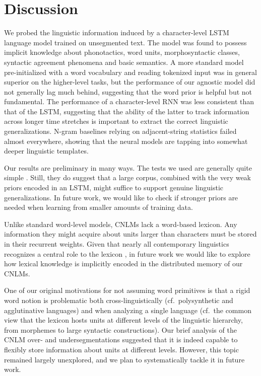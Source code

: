 \section{Discussion}
\label{sec:discussion}

We probed the linguistic information induced by a character-level LSTM
language model trained on unsegmented text. The model was found to
possess implicit knowledge about phonotactics, word units,
morphosyntactic classes, syntactic agreement phenomena and basic
semantics. A more standard model pre-initialized with a word
vocabulary and reading tokenized input was in general superior on the
higher-level tasks, but the performance of our agnostic model did not
generally lag much behind, suggesting that the word prior is helpful
but not fundamental. The performance of a character-level RNN was less
consistent than that of the LSTM, suggesting that the ability of the
latter to track information across longer time stretches is important
to extract the correct linguistic generalizations. N-gram baselines
relying on adjacent-string statistics failed almost everywhere,
showing that the neural models are tapping into somewhat deeper
linguistic templates.

Our results are preliminary in many ways. The tests we used are
generally quite simple \cite[we did not attempt, for example, to model
long-distance subject-verb agreement, a task that is challenging even
for word-based models:][]{Linzen:etal:2016}. Still, they do suggest
that a large corpus, combined with the very weak priors encoded in an
LSTM, might suffice to support genuine linguistic generalizations. In
future work, we would like to check if stronger priors are needed when
learning from smaller amounts of training data.

Unlike standard word-level models, CNLMs lack a word-based
lexicon. Any information they might acquire about units larger than
characters must be stored in their recurrent weights. Given that
nearly all contemporary linguistics recognizes a central role to the
lexicon \cite[see,
e.g.,][]{Sag:etal:2003,Goldberg:2005,Radford:2006,Bresnan:etal:2016,Jezek:2016},
in future work we would like to explore how lexical knowledge is
implicitly encoded in the distributed memory of our CNLMs.

One of our original motivations for not assuming word primitives is that a rigid word notion is problematic both cross-linguistically (cf.~polysynthetic and agglutinative languages) and when analyzing a single language (cf.~the common  view  that the lexicon hosts units at different levels of the linguistic hierarchy, from  morphemes to large syntactic constructions). Our brief analysis of the CNLM over- and undersegmentations suggested that it is indeed capable to flexibly store information about units at different levels. However, this topic  remained largely unexplored, and we plan to systematically tackle it in future work.

